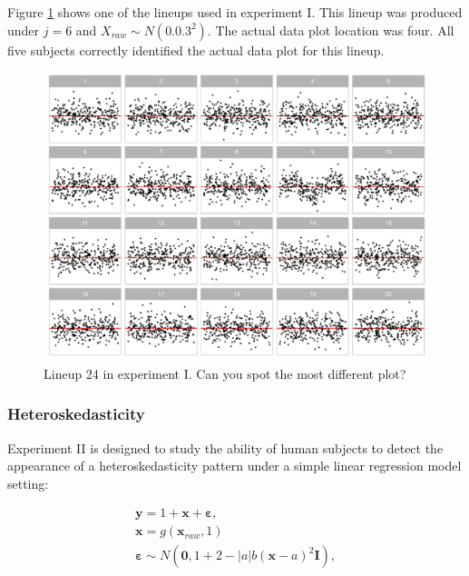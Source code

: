\documentclass[]{interact}
\theoremstyle{plain}%
\theoremstyle{definition}
\theoremstyle{remark}
\begin{document}
Figure \ref{fig:example-lineup} shows one of the lineups used in
experiment I. This lineup was produced under \(j = 6\) and
\(X_{raw} \sim N(0.0.3^2)\). The actual data plot location was four. All
five subjects correctly identified the actual data plot for this lineup.

\begin{figure}
\includegraphics[width=1\linewidth]{paper_comparison_files/figure-latex/example-lineup-1} \caption{Lineup 24 in experiment I. Can you spot the most different plot? \label{fig:example-lineup}}\label{fig:example-lineup}
\end{figure}

\hypertarget{heteroskedasticity}{%
\subsubsection{Heteroskedasticity}\label{heteroskedasticity}}

Experiment II is designed to study the ability of human subjects to
detect the appearance of a heteroskedasticity pattern under a simple
linear regression model setting:

\begin{align} \label{eq:heter-model}
\boldsymbol{y} = 1 + \boldsymbol{x} + \boldsymbol{\varepsilon},\\
\boldsymbol{x} = g(\boldsymbol{x}_{raw}, 1)\\
\boldsymbol{\varepsilon} \sim N(\boldsymbol{0}, 1 + 2 - |a| b (\boldsymbol{x} - a)^2 \boldsymbol{I}), \\
\end{align}
\end{document}
